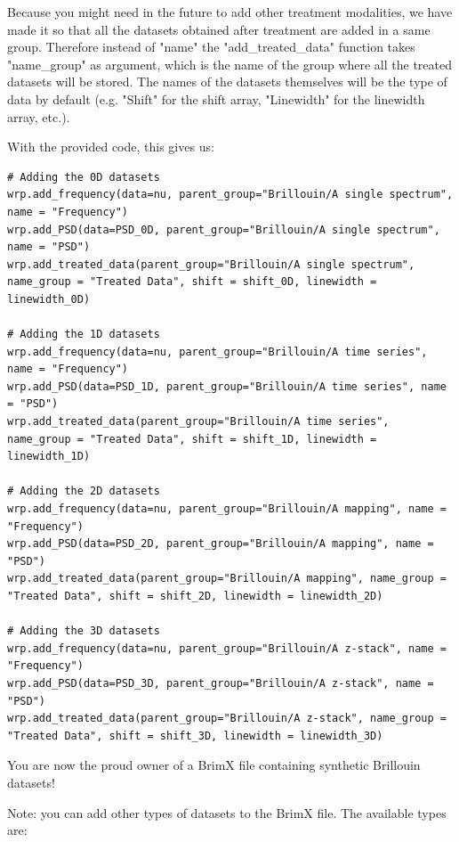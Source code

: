\documentclass{article}
\begin{document}
Because you might need in the future to add other treatment modalities, we have made it so that all the datasets obtained after treatment are added in a same group. Therefore instead of "name" the "add\_treated\_data" function takes "name\_group" as argument, which is the name of the group where all the treated datasets will be stored. The names of the datasets themselves will be the type of data by default (e.g. "Shift" for the shift array, "Linewidth" for the linewidth array, etc.).

With the provided code, this gives us:

\begin{lstlisting}
# Adding the 0D datasets
wrp.add_frequency(data=nu, parent_group="Brillouin/A single spectrum", name = "Frequency")
wrp.add_PSD(data=PSD_0D, parent_group="Brillouin/A single spectrum", name = "PSD")
wrp.add_treated_data(parent_group="Brillouin/A single spectrum", name_group = "Treated Data", shift = shift_0D, linewidth = linewidth_0D)

# Adding the 1D datasets
wrp.add_frequency(data=nu, parent_group="Brillouin/A time series", name = "Frequency")
wrp.add_PSD(data=PSD_1D, parent_group="Brillouin/A time series", name = "PSD")
wrp.add_treated_data(parent_group="Brillouin/A time series", name_group = "Treated Data", shift = shift_1D, linewidth = linewidth_1D)

# Adding the 2D datasets
wrp.add_frequency(data=nu, parent_group="Brillouin/A mapping", name = "Frequency")
wrp.add_PSD(data=PSD_2D, parent_group="Brillouin/A mapping", name = "PSD")
wrp.add_treated_data(parent_group="Brillouin/A mapping", name_group = "Treated Data", shift = shift_2D, linewidth = linewidth_2D)

# Adding the 3D datasets
wrp.add_frequency(data=nu, parent_group="Brillouin/A z-stack", name = "Frequency")
wrp.add_PSD(data=PSD_3D, parent_group="Brillouin/A z-stack", name = "PSD")
wrp.add_treated_data(parent_group="Brillouin/A z-stack", name_group = "Treated Data", shift = shift_3D, linewidth = linewidth_3D)
\end{lstlisting}

You are now the proud owner of a BrimX file containing synthetic Brillouin datasets!

Note: you can add other types of datasets to the BrimX file. The available types are:
\end{document}
